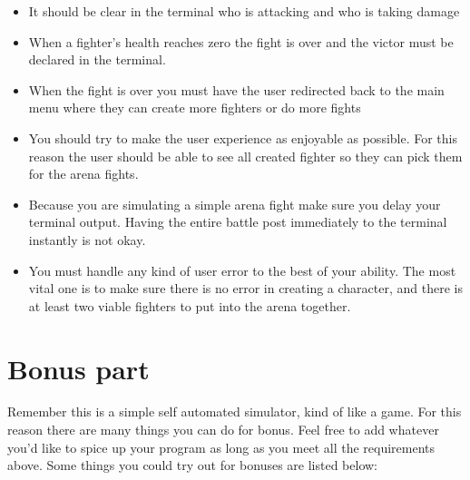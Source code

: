 \documentclass{42-en}
\begin{document}
\begin{itemize}
		\item It should be clear in the terminal who is attacking and who
		is taking damage
		\item When a fighter's health reaches zero the fight is over and the victor
		must be declared in the terminal.
		\item When the fight is over you must have the user redirected back
		to the main menu where they can create more fighters or do more fights


		\item You should try to make the user experience as enjoyable as
		possible. For this reason the user should be able to see all created
		fighter so they can pick them for the arena fights.
		\item Because you are simulating a simple arena fight make sure
		you delay your terminal output. Having the entire battle post
		immediately to the terminal instantly is not okay.
		\item You must handle any kind of user error to the best of your
		ability. The most vital one is to make sure there is no error in
		creating a character, and there is at least two viable fighters
		to put into the arena together.
		
	\end{itemize}

\chapter{Bonus part}
	
	Remember this is a simple self automated simulator, kind of like a game.
	For this reason there are many things you can do for bonus. Feel
	free to add whatever you'd like to spice up your program as long as
	you meet all the requirements above. Some things you could try out
	for bonuses are listed below:
\end{document}
